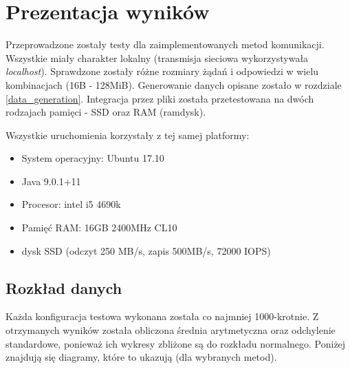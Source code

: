 \chapter{Prezentacja wyników}

Przeprowadzone zostały testy dla zaimplementowanych metod komunikacji. Wszystkie miały charakter lokalny (transmisja sieciowa wykorzystywała \textit{localhost}). Sprawdzone zostały różne rozmiary żądań i odpowiedzi w wielu kombinacjach (16B - 128MiB). Generowanie danych opisane zostało w rozdziale \ref{data_generation}.
Integracja przez pliki została przetestowana na dwóch rodzajach pamięci - SSD oraz RAM (ramdysk).

Wszystkie uruchomienia korzystały z tej samej platformy:
\begin{itemize}
    \item System operacyjny: Ubuntu 17.10
    \item Java 9.0.1+11
    \item Procesor: intel i5 4690k
    \item Pamięć RAM: 16GB 2400MHz CL10
    \item dysk SSD (odczyt 250 MB/s, zapis 500MB/s, 72000 IOPS)
\end{itemize}

\vspace{30mm} 

\section{Rozkład danych}

Każda konfiguracja testowa wykonana została co najmniej 1000-krotnie. Z otrzymanych wyników została obliczona średnia arytmetyczna oraz odchylenie standardowe, ponieważ ich wykresy zbliżone są do rozkładu normalnego. Poniżej znajdują się diagramy, które to ukazują (dla wybranych metod).



